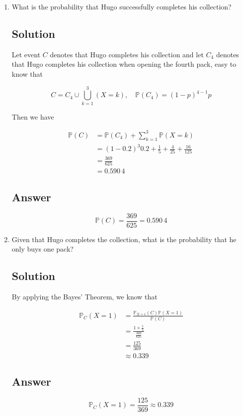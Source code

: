 \documentclass[12pt]{article}
\newcommand{\bP}{\mathbb{P}}
\begin{document}
\begin{enumerate}[start=1,label={\bfseries Part \arabic*:},leftmargin=0in]
		\bigskip\item What is the probability that Hugo successfully completes his collection?
		
		\subsection*{Solution}
		
			Let event $C$ denotes that Hugo completes his collection and let $C_4$ denotes that Hugo completes his collection when opening the fourth pack, easy to know that
			
			\[C = C_4 \cup \bigcup_{k=1}^3(X = k),\quad \bP(C_4) = (1-p)^{4-1}p\]
			
			Then we have
			
			\[
				\begin{aligned}
					\bP(C) &= \bP(C_4) + \sum_{k=1}^3\bP(X = k)\\
					&= (1-0.2)^{3}0.2 + \frac{1}{5} + \frac{4}{25} + \frac{16}{125}\\
					&= \frac{369}{625}\\
					&= 0.590\,4
				\end{aligned}
			\]
		
		\subsection*{Answer}
		
			\[\boxed{\bP(C) = \frac{369}{625} = 0.590\,4}\]
			
		\bigskip\item Given that Hugo completes the collection, what is the probability that he only buys one pack?
		
		\subsection*{Solution}
		
			By applying the Bayes’ Theorem, we know that
			
			\[
				\begin{aligned}
					\bP_C(X = 1) &= \frac{\bP_{X = 1}(C)\bP(X = 1)}{\bP(C)}\\
					&= \frac{1\times \frac{1}{5}}{\frac{369}{625}}\\
					&= \frac{125}{369}\\
					&\approx 0.339
				\end{aligned}
			\]
		
		\subsection*{Answer}
		
			\[\boxed{\bP_C(X = 1) = \frac{125}{369} \approx 0.339}\]
	\end{enumerate}
	
\end{document}
